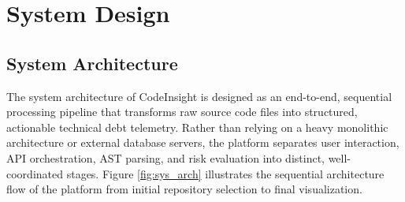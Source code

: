 \chapter{System Design}

\section{System Architecture}
The system architecture of CodeInsight is designed as an end-to-end, sequential processing pipeline that transforms raw source code files into structured, actionable technical debt telemetry. Rather than relying on a heavy monolithic architecture or external database servers, the platform separates user interaction, API orchestration, AST parsing, and risk evaluation into distinct, well-coordinated stages. Figure \ref{fig:sys_arch} illustrates the sequential architecture flow of the platform from initial repository selection to final visualization.


